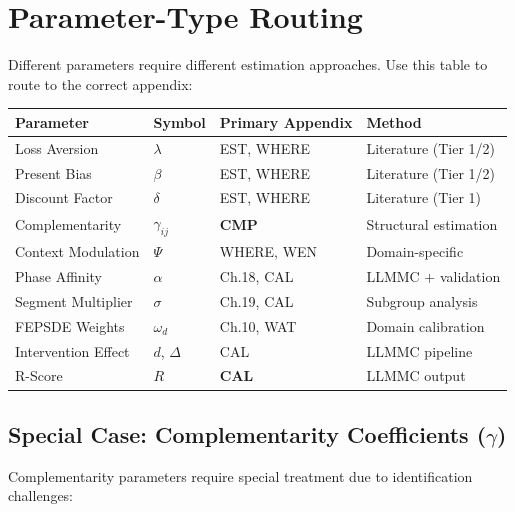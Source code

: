 
\section{Parameter-Type Routing}
\label{sec:pm-routing}

Different parameters require different estimation approaches. Use this table to route to the correct appendix:

\begin{center}
\begin{tabular}{llll}
\toprule
\textbf{Parameter} & \textbf{Symbol} & \textbf{Primary Appendix} & \textbf{Method} \\
\midrule
Loss Aversion & $\lambda$ & EST, WHERE & Literature (Tier 1/2) \\
Present Bias & $\beta$ & EST, WHERE & Literature (Tier 1/2) \\
Discount Factor & $\delta$ & EST, WHERE & Literature (Tier 1) \\
Complementarity & $\gamma_{ij}$ & \textbf{CMP} & Structural estimation \\
Context Modulation & $\Psi$ & WHERE, WEN & Domain-specific \\
Phase Affinity & $\alpha$ & Ch.18, CAL & LLMMC + validation \\
Segment Multiplier & $\sigma$ & Ch.19, CAL & Subgroup analysis \\
FEPSDE Weights & $\omega_d$ & Ch.10, WAT & Domain calibration \\
Intervention Effect & $d$, $\Delta$ & CAL & LLMMC pipeline \\
R-Score & $R$ & \textbf{CAL} & LLMMC output \\
\bottomrule
\end{tabular}
\end{center}

\subsection{Special Case: Complementarity Coefficients ($\gamma$)}

Complementarity parameters require special treatment due to identification challenges:

